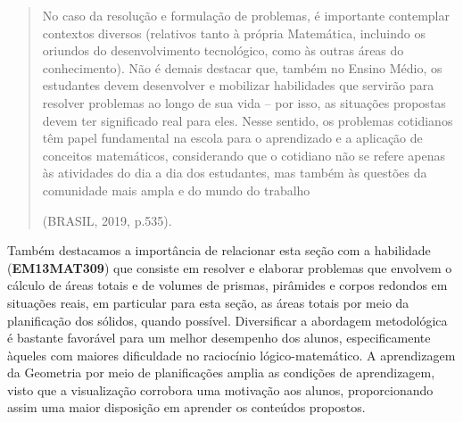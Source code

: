 \begin{paginatexto}
{\begin{quote}
No caso da resolução e formulação de problemas, é importante contemplar contextos diversos (relativos tanto à própria Matemática, incluindo os oriundos do desenvolvimento tecnológico, como às outras áreas do conhecimento). Não é demais destacar que, também no Ensino Médio, os estudantes devem desenvolver e mobilizar habilidades que servirão para resolver problemas ao longo de sua vida – por isso, as situações propostas devem ter significado real para eles. Nesse sentido, os problemas cotidianos têm papel fundamental na escola para o aprendizado e a aplicação de conceitos matemáticos, considerando que o cotidiano não se refere apenas às atividades do dia a dia dos estudantes, mas também às questões da comunidade mais ampla e do mundo do trabalho 

\flushright
(BRASIL, 2019, p.535).
\end{quote}

Também destacamos a importância de relacionar esta seção com a habilidade (\textbf{EM13MAT309}) que consiste em resolver e elaborar problemas que envolvem o cálculo de áreas totais e de volumes de prismas, pirâmides e corpos redondos em situações reais, em particular para esta seção, as áreas totais por meio da planificação dos sólidos, quando possível.
Diversificar a abordagem metodológica é bastante favorável para um melhor desempenho dos alunos, especificamente àqueles com maiores dificuldade no raciocínio lógico-matemático. A aprendizagem da Geometria por meio de planificações amplia as condições de aprendizagem, visto que a visualização corrobora uma motivação aos alunos, proporcionando assim uma maior disposição em aprender os conteúdos propostos.
}
\end{paginatexto}

